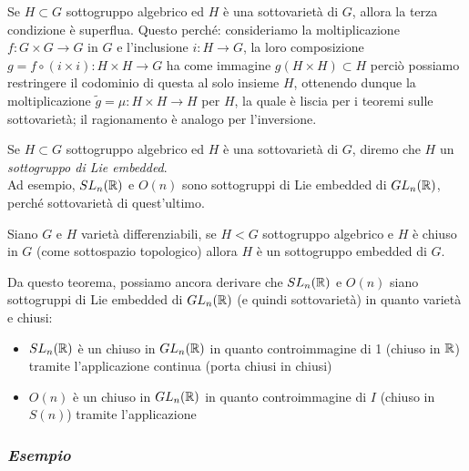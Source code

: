 \begin{remark}
	Se $ H \subset G $ sottogruppo algebrico ed $ H $ è una sottovarietà di $ G $, allora la terza condizione è superflua. Questo perché: consideriamo la moltiplicazione $ f : G \times G \to G $ in $ G $ e l'inclusione $ i : H \to G $, la loro composizione $ g = f \circ (i \times i) : H \times H \to G $ ha come immagine $ g(H \times H) \subset H $ perciò possiamo restringere il codominio di questa al solo insieme $ H $, ottenendo dunque la moltiplicazione $ \tilde{g} = \mu : H \times H \to H $ per $ H $, la quale è liscia per i teoremi sulle sottovarietà; il ragionamento è analogo per l'inversione.
\end{remark}

Se $ H \subset G $ sottogruppo algebrico ed $ H $ è una sottovarietà di $ G $, diremo che $ H $ un \textit{sottogruppo di Lie embedded}.\\
Ad esempio, $ SL_{n}(\mathbb{R}) $ e $ O(n) $ sono sottogruppi di Lie embedded di $ GL_{n}(\mathbb{R}) $, perché sottovarietà di quest'ultimo.

\begin{theorem}
	Siano $ G $ e $ H $ varietà differenziabili, se $ H < G $ sottogruppo algebrico e $ H $ è chiuso in $ G $ (come sottospazio topologico) allora $ H $ è un sottogruppo embedded di $ G $.
\end{theorem}

Da questo teorema, possiamo ancora derivare che $ SL_{n}(\mathbb{R}) $ e $ O(n) $ siano sottogruppi di Lie embedded di $ GL_{n}(\mathbb{R}) $ (e quindi sottovarietà) in quanto varietà e chiusi:

\begin{itemize}
	\item $ SL_{n}(\mathbb{R}) $ è un chiuso in $ GL_{n}(\mathbb{R}) $ in quanto controimmagine di 1 (chiuso in $ \mathbb{R} $) tramite l'applicazione continua (porta chiusi in chiusi)
	
	
	\item $ O(n) $ è un chiuso in $ GL_{n}(\mathbb{R}) $ in quanto controimmagine di $ I $ (chiuso in $ S(n) $) tramite l'applicazione
	
\end{itemize}

\subsubsection{\textit{Esempio}}

